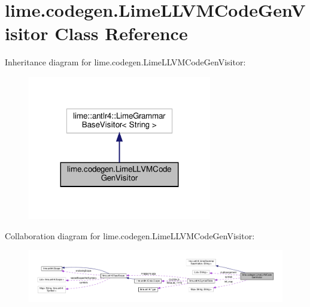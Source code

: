 \hypertarget{classlime_1_1codegen_1_1LimeLLVMCodeGenVisitor}{}\section{lime.\+codegen.\+Lime\+L\+L\+V\+M\+Code\+Gen\+Visitor Class Reference}
\label{classlime_1_1codegen_1_1LimeLLVMCodeGenVisitor}


Inheritance diagram for lime.\+codegen.\+Lime\+L\+L\+V\+M\+Code\+Gen\+Visitor\+:
\nopagebreak
\begin{figure}[H]
\begin{center}
\leavevmode
\includegraphics[width=227pt]{classlime_1_1codegen_1_1LimeLLVMCodeGenVisitor__inherit__graph}
\end{center}
\end{figure}


Collaboration diagram for lime.\+codegen.\+Lime\+L\+L\+V\+M\+Code\+Gen\+Visitor\+:
\nopagebreak
\begin{figure}[H]
\begin{center}
\leavevmode
\includegraphics[width=350pt]{classlime_1_1codegen_1_1LimeLLVMCodeGenVisitor__coll__graph}
\end{center}
\end{figure}
